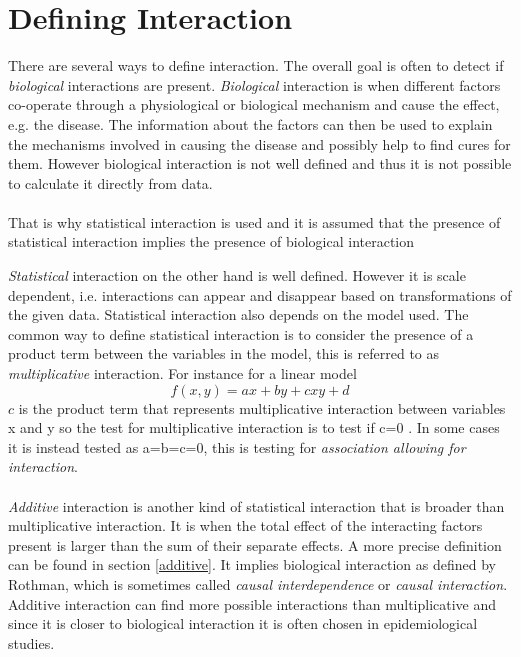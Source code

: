 \documentclass[10pt,a4paper]{report}
\begin{document}
\section{Defining Interaction}
\label{interaction}
There are several ways to define interaction. The overall goal is often to detect if \emph{biological} interactions are present. \emph{Biological} interaction is when different factors co-operate through a physiological or biological mechanism and cause the effect, e.g. the disease. The information about the factors can then be used to explain the mechanisms involved in causing the disease and possibly help to find cures for them. However biological interaction is not well defined and thus it is not possible to calculate it directly from data.\cite{interaction_confusion, rothman2008modern,rothman2002intro_epidemiology}\\
\\
That is why statistical interaction is used and it is assumed that the presence of statistical interaction implies the presence of biological interaction

\emph{Statistical} interaction on the other hand is well defined. However it is scale dependent, i.e. interactions can appear and disappear based on transformations of the given data. Statistical interaction also depends on the model used. The common way to define statistical interaction is to consider the presence of a product term between the variables in the model, this is referred to as \emph{multiplicative} interaction. For instance for a linear model
\begin{equation}
f(x,y)=ax+by+cxy+d
\end{equation}
$c$ is the product term that represents multiplicative interaction between variables x and y so the test for multiplicative interaction is to test if c=0 \cite{geira, interaction_confusion, rothman2008modern}. In some cases it is instead tested as a=b=c=0, this is testing for \emph{association allowing for interaction}\cite{cordell_detect_review}.\\
\\
\emph{Additive} interaction is another kind of statistical interaction that is broader than multiplicative interaction. It is when the total effect of the interacting factors present is larger than the sum of their separate effects. A more precise definition can be found in section \ref{additive}. It implies biological interaction as defined by Rothman\cite{rothman2008modern}, which is sometimes called \emph{causal interdependence} or \emph{causal interaction}\cite{causal_bounds_arvid}. Additive interaction can find more possible interactions than multiplicative and since it is closer to biological interaction it is often chosen in epidemiological studies\cite{interaction_confusion}.  
\end{document}
